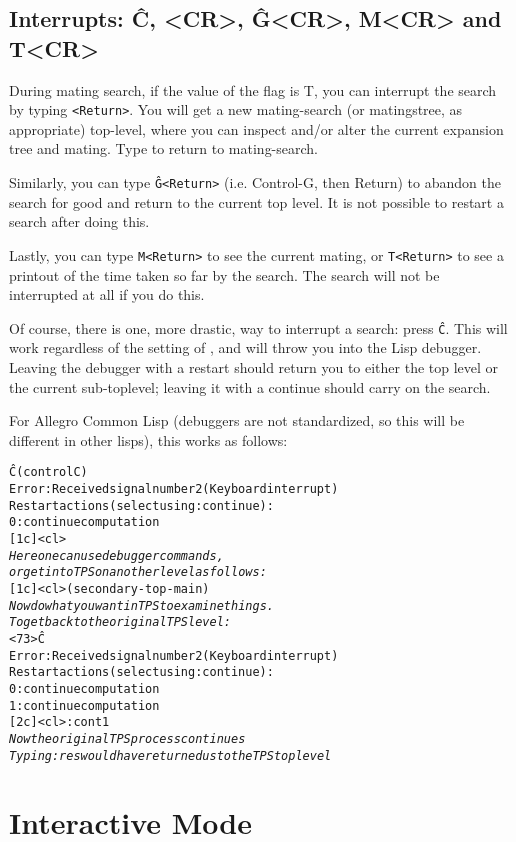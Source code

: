 \subsection{Interrupts: \^C, <CR>, \^G<CR>, M<CR> and T<CR>}\label{interrupt}

During mating search, if the value of the flag  is
T, you can interrupt the search by typing {\tt <Return>}.  You will get
a new mating-search (or matingstree, as appropriate) top-level, where you can inspect
and/or alter the current expansion tree and mating.  Type  to return to mating-search.

Similarly, you can type {\tt \^G<Return>} (i.e. Control-G, then Return) to abandon the
search for good and return to the current top level. It is not possible to restart a
search after doing this.

Lastly, you can type {\tt M<Return>} to see the current mating, or {\tt T<Return>} to see a
printout of the time taken so far by the search. The search will not be interrupted at all if you do this.

Of course, there is one, more drastic, way to interrupt a search: press {\tt \^C}.
This will work regardless of the setting of , and will throw you into
the Lisp debugger. Leaving the debugger with a restart should return you to either the {\TPS} top level or the
current sub-toplevel; leaving it with a continue should carry on the search.

For Allegro Common Lisp (debuggers are not standardized, so this will be different in other lisps),
this works as follows:
\begin{alltt}
\^C                             (control C)
Error: Received signal number 2 (Keyboard interrupt)
Restart actions (select using :continue):
 0: continue computation
[1c] <cl>		
	{\it Here one can use debugger commands,
        or get into TPS on another level as follows:}
[1c] <cl> (secondary-top-main)
	{\it Now do what you want in TPS to examine things.
        To get back to the original TPS level:}
<73>\^C
Error: Received signal number 2 (Keyboard interrupt)
Restart actions (select using :continue):
 0: continue computation
 1: continue computation
[2c] <cl> :cont 1
{\it Now the original TPS process continues}
{\it Typing :res would have returned us to the TPS top level}
\end{alltt}


\section{Interactive Mode}

